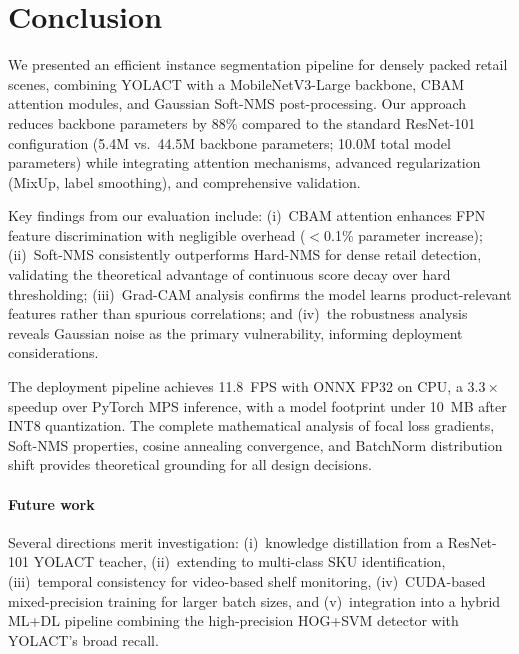 \documentclass[conference]{IEEEtran}
\begin{document}
\section{Conclusion}
\label{sec:conclusion}

We presented an efficient instance segmentation pipeline for densely
packed retail scenes, combining YOLACT with a MobileNetV3-Large backbone,
CBAM attention modules, and Gaussian Soft-NMS post-processing. Our
approach reduces backbone parameters by 88\% compared to the standard
ResNet-101 configuration (5.4M vs.\ 44.5M backbone parameters; 10.0M
total model parameters) while integrating attention mechanisms, advanced
regularization (MixUp, label smoothing), and comprehensive validation.

Key findings from our evaluation include: (i)~CBAM attention enhances
FPN feature discrimination with negligible overhead ($<$0.1\% parameter
increase); (ii)~Soft-NMS consistently outperforms Hard-NMS for dense
retail detection, validating the theoretical advantage of continuous
score decay over hard thresholding; (iii)~Grad-CAM analysis confirms
the model learns product-relevant features rather than spurious
correlations; and (iv)~the robustness analysis reveals Gaussian noise
as the primary vulnerability, informing deployment considerations.

The deployment pipeline achieves 11.8~FPS with ONNX FP32 on CPU, a
$3.3\times$ speedup over PyTorch MPS inference, with a model footprint
under 10~MB after INT8 quantization. The complete mathematical analysis
of focal loss gradients, Soft-NMS properties, cosine annealing
convergence, and BatchNorm distribution shift provides theoretical
grounding for all design decisions.

\paragraph{Future work}
Several directions merit investigation:
(i)~knowledge distillation from a ResNet-101 YOLACT teacher,
(ii)~extending to multi-class SKU identification,
(iii)~temporal consistency for video-based shelf monitoring,
(iv)~CUDA-based mixed-precision training for larger batch sizes,
and (v)~integration into a hybrid ML+DL pipeline combining the
high-precision HOG+SVM detector with YOLACT's broad recall.



\end{document}
